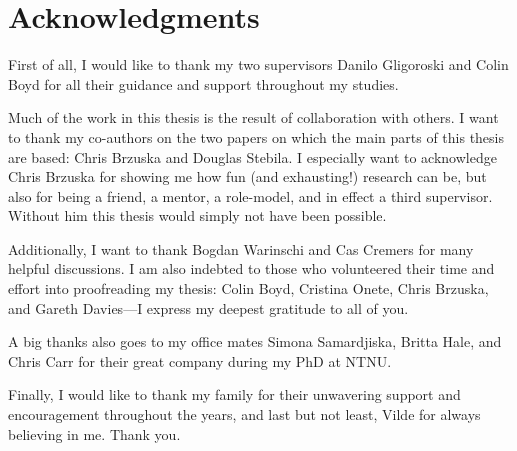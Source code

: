 \chapter*{Acknowledgments}\label{sec:acknowledgment}


First of all, I would like to thank my two supervisors Danilo Gligoroski and Colin Boyd for all their guidance and support throughout my studies.
%


Much of the work in this thesis is the result of collaboration with others.
I want to thank my co-authors on the two papers on which the main parts of this thesis are based:
Chris Brzuska and Douglas Stebila.
I especially want to acknowledge Chris Brzuska for showing me how fun (and exhausting!) research can be,
but also for being a friend, a mentor, a role-model, and in effect a third supervisor.
Without him this thesis would simply not have been possible.

Additionally,
I want to thank Bogdan Warinschi and Cas Cremers for many helpful discussions.
I am also indebted to those who volunteered their time and effort into proofreading my thesis:
Colin Boyd, Cristina Onete, Chris Brzuska, and Gareth Davies---I express my deepest gratitude to all of you.



A big thanks also goes to my office mates Simona Samardjiska, Britta Hale, and Chris Carr for their great company during my PhD at NTNU.

Finally,
I would like to thank my family for their unwavering support and encouragement throughout the years,
and last but not least, Vilde for always believing in me. Thank you.
